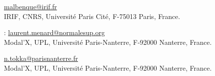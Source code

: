 \documentclass[11pt,reqno,tbtags]{amsart}
\numberwithin{equation}{section}
\numberwithin{theo}{section}
\theoremstyle{definition}
\begin{document}
\bigskip

{ {} \href{mailto:malbenque@irif.fr}{malbenque@irif.fr}}\\
{IRIF, CNRS, Université Paris Cité, F-75013 Paris, France.}

\medskip

{ {}: \href{mailto:laurent.menard@normalesup.org}{laurent.menard@normalesup.org}}\\
{Modal'X, UPL, Université Paris-Nanterre, F-92000 Nanterre, France.}

\medskip

{ {} \href{mailto:n.tokka@parisnanterre.fr}{n.tokka@parisnanterre.fr}}\\
{Modal'X, UPL, Université Paris-Nanterre, F-92000 Nanterre, France.}
\end{document}
